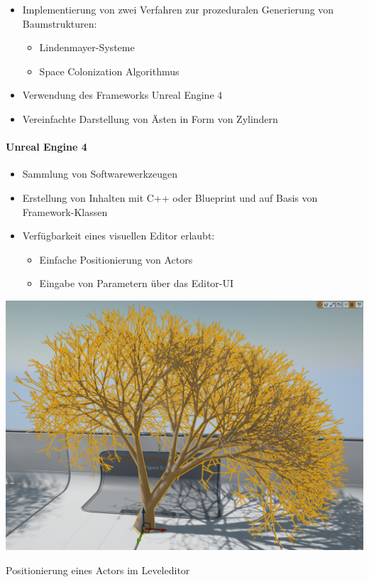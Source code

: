 \begin{itemize}
	\item Implementierung von zwei Verfahren zur prozeduralen Generierung von Baumstrukturen:
	\begin{itemize}
		\item Lindenmayer-Systeme
		\item Space Colonization Algorithmus\\
	\end{itemize}
	\item Verwendung des Frameworks \glqq Unreal Engine 4\grqq\\
	
	\item Vereinfachte Darstellung von Ästen in Form von Zylindern
\end{itemize}

\newpage
{}
\paragraph{Unreal Engine 4\\}

\begin{itemize}
	\item Sammlung von Softwarewerkzeugen \\
	
	\item Erstellung von Inhalten mit C++ oder Blueprint und auf Basis von Framework-Klassen\\
	
	\item Verfügbarkeit eines visuellen Editor erlaubt:
	\begin{itemize}
		\item Einfache Positionierung von Actors
		\item Eingabe von Parametern über das Editor-UI
	\end{itemize}
\end{itemize}

\iffalse

\newpage
\begin{center}
	\includegraphics[height=0.9\textheight]{images/CH1_EditorExample1.png}
	
	Positionierung eines Actors im Leveleditor
\end{center}

